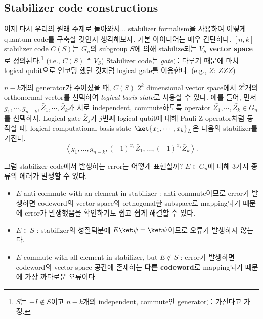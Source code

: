 \subsection{Stabilizer code constructions}
이제 다시 우리의 원래 주제로 돌아와서... stabilizer formalism을 사용하여 어떻게 quantum code를 구축할 것인지 생각해보자. 기본 아이디어는 매우 간단하다. $[n, k]$ stabilizer code $C(S)$는 $G_n$의 subgroup $S$에 의해 stabilize되는 $V_S$ \textbf{vector space}로 정의된다.\footnote{$S$는 $-I \notin S$이고 $n-k$개의 independent, commute인 generator를 가진다고 가정.} (i.e., $C(S) \triangleq V_S$) Stabilizer code는 \textit{gate}를 다루기 때문에 마치 logical qubit으로 인코딩 했던 것처럼 logical gate를 이용한다. (e.g., $\bar Z$: $ZZZ$) 

$n-k$개의 generator가 주어졌을 때, $C(S)$ $2^k$ dimensional vector space에서 $2^k$개의 orthonormal vector를 선택하여 \textit{logical basis state}로 사용할 수 있다.
예를 들어, 먼저 $g_1, \cdots, g_{n-k}, \bar{Z}_1, \cdots, \bar Z_k$가 서로 independent, commute하도록 operator $\bar{Z_1}, \cdots, \bar{Z_k} \in G_n$를 선택하자. Logical gate $\bar Z_j$가 $j$번쨰 logical qubit에 대해 Pauli Z operator처럼 동작할 때, logical computational basis state $\ket{x_1, \cdots, x_k}_L$은 다음의 stabilizer를 가진다.
\begin{equation*}
    \left\langle g_1, \ldots, g_{n-k},(-1)^{x_1} \bar{Z}_1, \ldots,(-1)^{x_k} \bar{Z}_k\right\rangle .
\end{equation*}

그럼 stabilizer code에서 발생하는 error는 어떻게 표현할까? $E \in G_n$에 대해 3가지 종류의 에러가 발생할 수 있다. 
\begin{itemize}
    \item $E$ anti-commute with an element in stabilizer : anti-commute이므로 error가 발생하면 codeword의 vector space와 orthogonal한 subspace로 mapping되기 때문에 error가 발생했음을 확인하기도 쉽고 쉽게 해결할 수 있다. 
    \item $E \in S$ : stabilizer의 성질덕분에 $E \ket \psi = \ket \psi$이므로 오류가 발생하지 않는다.
    \item $E$ commute with all element in stabilizer, but $E \notin S$ : error가 발생하면 codeword의 vector space 공간에 존재하는 \textbf{다른 codeword}로 mapping되기 때문에 가장 까다로운 오류이다.
\end{itemize}
